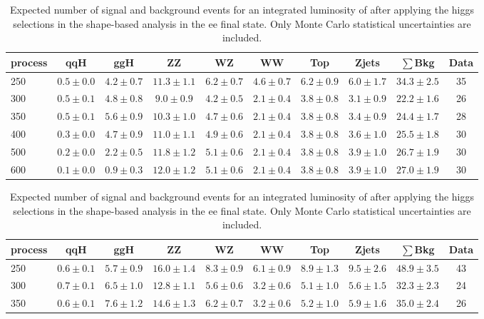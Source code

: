 \begin{table}
{\footnotesize
 \begin{center}
 \begin{tabular}{l | c c | c c c c c c | c}
 \hline
 process & qqH & ggH & ZZ & WZ & WW & Top & Zjets & $\sum$Bkg  & Data\\
 \hline
250 & $0.5\pm0.0$ & $4.2\pm0.7$ & $11.3\pm1.1$ & $6.2\pm0.7$ & $4.6\pm0.7$ & $6.2\pm0.9$ & $6.0\pm1.7$ & $34.3\pm2.5$ & 35 \\
300 & $0.5\pm0.1$ & $4.8\pm0.8$ & $9.0\pm0.9$ & $4.2\pm0.5$ & $2.1\pm0.4$ & $3.8\pm0.8$ & $3.1\pm0.9$ & $22.2\pm1.6$ & 26 \\
350 & $0.5\pm0.1$ & $5.6\pm0.9$ & $10.3\pm1.0$ & $4.7\pm0.6$ & $2.1\pm0.4$ & $3.8\pm0.8$ & $3.4\pm0.9$ & $24.4\pm1.7$ & 28 \\
400 & $0.3\pm0.0$ & $4.7\pm0.9$ & $11.0\pm1.1$ & $4.9\pm0.6$ & $2.1\pm0.4$ & $3.8\pm0.8$ & $3.6\pm1.0$ & $25.5\pm1.8$ & 30 \\
500 & $0.2\pm0.0$ & $2.2\pm0.5$ & $11.8\pm1.2$ & $5.1\pm0.6$ & $2.1\pm0.4$ & $3.8\pm0.8$ & $3.9\pm1.0$ & $26.7\pm1.9$ & 30 \\
600 & $0.1\pm0.0$ & $0.9\pm0.3$ & $12.0\pm1.2$ & $5.1\pm0.6$ & $2.1\pm0.4$ & $3.8\pm0.8$ & $3.9\pm1.0$ & $27.0\pm1.9$ & 30 \\
\hline
\end{tabular}
\end{center}
}
\caption{Expected number of signal and background events for an 
  integrated luminosity of \intlumi after applying the higgs selections in the shape-based analysis in the ee final state. 
  Only Monte Carlo statistical uncertainties are included. }
\label{tab:yield_shapebased_ee}
{\footnotesize
 \begin{center}
 \begin{tabular}{l | c c |  c c c c c c | c }
 \hline
 process & qqH & ggH & ZZ & WZ & WW & Top & Zjets  & $\sum$Bkg & Data \\
 \hline
250 & $0.6\pm0.1$ & $5.7\pm0.9$ & $16.0\pm1.4$ & $8.3\pm0.9$ & $6.1\pm0.9$ & $8.9\pm1.3$ & $9.5\pm2.6$ & $48.9\pm3.5$ & 43 \\
300 & $0.7\pm0.1$ & $6.5\pm1.0$ & $12.8\pm1.1$ & $5.6\pm0.6$ & $3.2\pm0.6$ & $5.1\pm1.0$ & $5.6\pm1.5$ & $32.3\pm2.3$ & 24 \\
350 & $0.6\pm0.1$ & $7.6\pm1.2$ & $14.6\pm1.3$ & $6.2\pm0.7$ & $3.2\pm0.6$ & $5.2\pm1.0$ & $5.9\pm1.6$ & $35.0\pm2.4$ & 26 \\

\end{tabular}
\end{center}}
\end{table}
